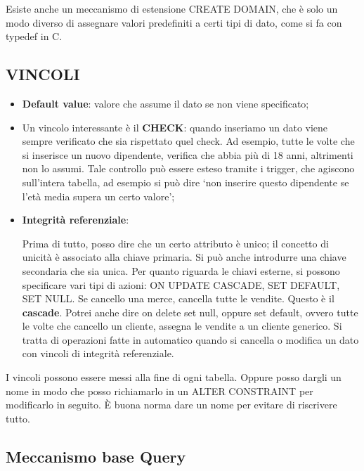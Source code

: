 Esiste anche un meccanismo di estensione CREATE DOMAIN, che è solo un modo diverso di assegnare valori predefiniti a certi tipi di dato,  come si fa con typedef in C. 

\subsection{VINCOLI}


\begin{itemize}

\item{\textbf{Default value}}: valore che assume il dato se non viene specificato;

\item Un vincolo interessante è il \textbf{CHECK}: quando inseriamo un dato viene sempre verificato che sia rispettato quel check. Ad esempio, tutte le volte che si inserisce un nuovo dipendente, verifica che abbia più di 18 anni, altrimenti non lo assumi.  Tale controllo può essere esteso tramite i trigger, che agiscono sull’intera tabella, ad esempio si può dire ‘non inserire questo dipendente se l'età media supera un certo valore’;

\item{\textbf{Integrità referenziale}}:

Prima di tutto, posso dire che un certo attributo è unico; il concetto di unicità  è associato alla chiave primaria. Si può anche introdurre una chiave secondaria che sia unica. Per quanto riguarda le chiavi esterne, si possono specificare vari tipi di azioni: ON UPDATE CASCADE, SET DEFAULT, SET NULL. Se cancello una merce, cancella tutte le vendite. Questo è il \textbf{cascade}. Potrei anche dire on delete set null, oppure set default, ovvero tutte le volte che cancello un cliente, assegna le vendite a un cliente generico. Si tratta di operazioni fatte in automatico quando si cancella o modifica un dato con vincoli di integrità referenziale.  

\end{itemize}
 
I vincoli possono essere messi alla fine di ogni tabella. Oppure posso dargli un nome in modo che posso richiamarlo in un ALTER CONSTRAINT per modificarlo in seguito. È buona norma dare un nome per evitare di riscrivere tutto. 

\subsection{Meccanismo base Query}


